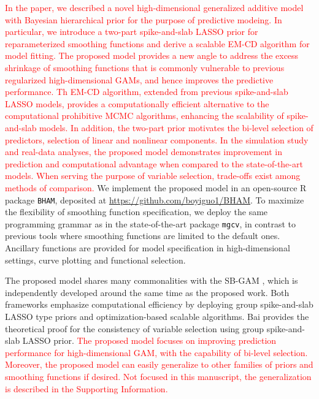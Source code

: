 \documentclass[AMA,STIX1COL,]{WileyNJD-v2}
\begin{document}
\textcolor{red}{In the paper, we described a novel high-dimensional generalized additive model with Bayesian hierarchical prior for the purpose of predictive modeing. In particular, we introduce a two-part spike-and-slab LASSO prior for reparameterized smoothing functions and derive a scalable EM-CD algorithm for model fitting. The proposed model provides a new angle to address the excess shrinkage of smoothing functions that is commonly vulnerable to previous regularized high-dimensional GAMs, and hence improves the predictive performance. Th EM-CD algorithm, extended from previous spike-and-slab LASSO models, provides a computationally efficient alternative to the computational prohibitive MCMC algorithms, enhancing the scalability of spike-and-slab models. In addition, the two-part prior motivates the bi-level selection of predictors, selection of linear and nonlinear components. In the simulation study and real-data analyses, the proposed model demonstrates improvement in prediction and computational advantage when compared to the state-of-the-art models. When serving the purpose of variable selection, trade-offs exist among methods of comparison.}
We implement the proposed model in an open-source R package
\texttt{BHAM}, deposited at \url{https://github.com/boyiguo1/BHAM}. To
maximize the flexibility of smoothing function specification, we deploy
the same programming grammar as in the state-of-the-art package
\texttt{mgcv}, in contrast to previous tools where smoothing functions
are limited to the default ones. Ancillary functions are provided for
model specification in high-dimensional settings, curve plotting and
functional selection.

The proposed model shares many commonalities with the SB-GAM
\citep{Bai2021}, which is independently developed around the same time
as the proposed work. Both frameworks emphasize computational efficiency
by deploying group spike-and-slab LASSO type priors and
optimization-based scalable algorithms. Bai provides the theoretical
proof for the consistency of variable selection using group
spike-and-slab LASSO prior.
\textcolor{red}{The proposed model focuses on improving prediction performance for high-dimensional GAM, with the capability of bi-level selection. Moreover, the proposed model can easily generalize to other families of priors and smoothing functions if desired. Not focused in this manuscript, the generalization is described in the Supporting Information.}
\end{document}
